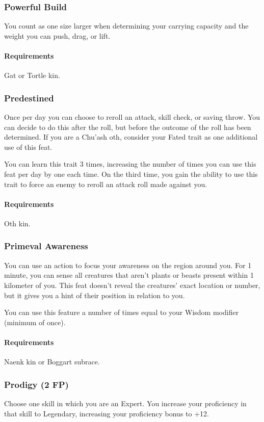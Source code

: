 \subsubsection{Powerful Build} \label{feat::powerfulbuild_kin}
    You count as one size larger when determining your carrying capacity and the weight you can push, drag, or lift.
    \paragraph{Requirements} Gat or Tortle kin.
\subsubsection{Predestined} \label{feat::predenstined}
    Once per day you can choose to reroll an attack, skill check, or saving throw.
    You can decide to do this after the roll, but before the outcome of the roll has been determined.
    If you are a Chu'ash oth, consider your Fated trait as one additional use of this feat.

    You can learn this trait 3 times, increasing the number of times you can use this feat per day by one each time.
    On the third time, you gain the ability to use this trait to force an enemy to reroll an attack roll made against you.
    \paragraph{Requirements} Oth kin.
\subsubsection{Primeval Awareness} \label{feat::primevalawareness}
    You can use an action to focus your awareness on the region around you.
    For 1 minute, you can sense all creatures that aren't plants or beasts present within 1 kilometer of you.
    This feat doesn't reveal the creatures' exact location or number, but it gives you a hint of their position in relation to you.

    You can use this feature a number of times equal to your Wisdom modifier (minimum of once).
    \paragraph{Requirements} Naenk kin or Boggart subrace.
\subsubsection{Prodigy (2 FP)} \label{feat::prodigy}
    Choose one skill in which you are an Expert.
    You increase your proficiency in that skill to Legendary, increasing your proficiency bonus to +12.
